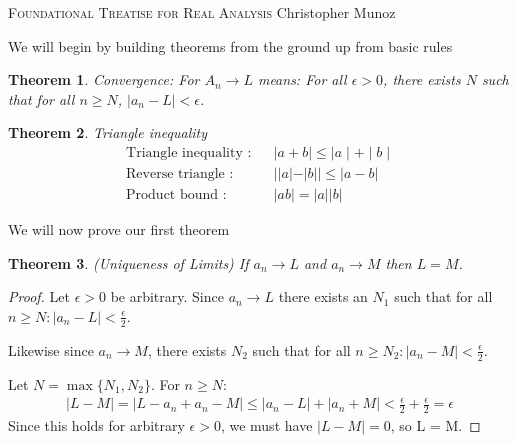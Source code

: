 \documentclass[12pt]{article}
\newtheorem{theorem}{Theorem}[section]
\newcommand{\eps}{\ensuremath{\epsilon}}
\begin{document}
\small
\noindent \textsc{Foundational Treatise for Real Analysis} \hfill Christopher Munoz

\normalsize
\bigskip
We will begin by building theorems from the ground up from basic rules

\begin{theorem} Convergence: For $A_n \to L$ means: For all $\eps > 0$, there exists $N$ such that for all $n \geq N$, $\mid a_n - L\mid < \eps$.
\end{theorem}

\begin{theorem} Triangle inequality
  \begin{align*}
    \text{Triangle inequality :} && \mid a + b \mid \leq \mid a \mid + \mid b \mid \\
    \text{Reverse triangle :} && ||a| - |b|| \leq |a - b| \\
    \text{Product bound :} && |ab| = |a||b|
  \end{align*}
\end{theorem}
We will now prove our first theorem

\begin{theorem} (Uniqueness of Limits) If $a_n \to L$ and $a_n \to M$ then $L = M$.
\end{theorem}
\begin{proof}
  Let $\eps > 0$ be arbitrary. Since $a_n \to L$ there exists an $N_1$ such that for all $n \geq N : |a_n -L| < \frac{\eps}{2}$.
  
  Likewise since $a_n \to M$, there exists $N_2$ such that for all $n \geq N_2: |a_n - M| < \frac{\eps}{2}$. 

  Let $N = \max\{N_1,N_2\}$. For $n \geq N$:
  \begin{align*}
    |L - M| = |L - a_n + a_n - M| \leq |a_n - L| + |a_n + M| < \frac{\eps}{2} + \frac{\eps}{2} = \eps
  \end{align*}
  Since this holds for arbitrary $\eps > 0$, we must have $|L - M| = 0$, so L = M.

\end{proof}
\end{document}
